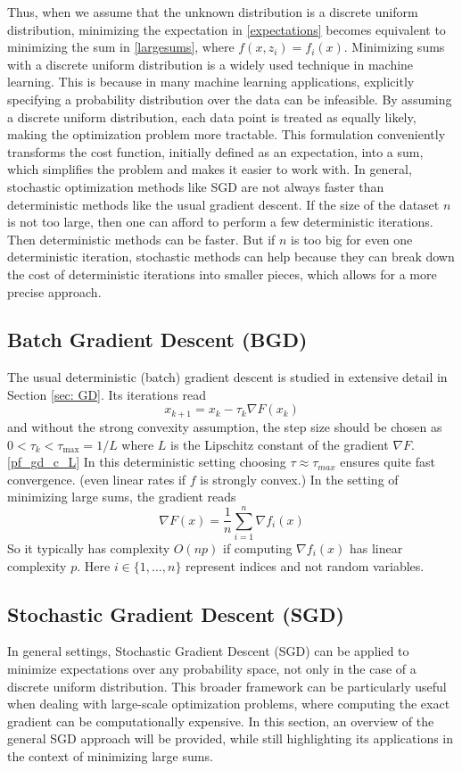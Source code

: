 Thus, when we assume that the unknown distribution is a discrete uniform distribution, minimizing the expectation in \ref{expectations} becomes equivalent to minimizing the sum in \ref{largesums}, where $f(x, z_i) = f_{i}(x).$ Minimizing sums with a discrete uniform distribution is a widely used technique in machine learning. This is because in many machine learning applications, explicitly specifying a probability distribution over the data can be infeasible. By assuming a discrete uniform distribution, each data point is treated as equally likely, making the optimization problem more tractable. This formulation conveniently transforms the cost function, initially defined as an expectation, into a sum, which simplifies the problem and makes it easier to work with. In general, stochastic optimization methods like SGD are not always faster than deterministic methods like the usual gradient descent. If the size of the dataset $n$ is not too large, then one can afford to perform a few deterministic iterations. Then deterministic methods can be faster. But if $n$ is too big for even one deterministic iteration, stochastic methods can help because they can break down the cost of deterministic iterations into smaller pieces, which allows for a more precise approach.

\subsection{Batch Gradient Descent (BGD)}
The usual deterministic (batch) gradient descent is studied in extensive detail in Section \ref{sec: GD}. Its iterations read $$x_{k+1} = x_{k} - \tau_{k}\nabla F(x_{k})$$
and without the strong convexity assumption, the step size should be chosen as $0 < \tau_{k} < \tau_{\text{max}} = 1/L$ where $L$ is the Lipschitz constant of the gradient $\nabla F$. \ref{pf_gd_c_L} In this deterministic setting choosing $\tau \approx \tau_{max}$ ensures quite fast convergence. (even linear rates if $f$ is strongly convex.) In the setting of minimizing large sums, the gradient reads 
\begin{equation*}\label{full_grad_of_sum}\tag{4.3.1}
\nabla F(x) = \frac{1}{n} \sum_{i=1}^{n}\nabla f_{i}(x)
\end{equation*}
So it typically has complexity $O(np)$ if computing $\nabla f_{i}(x)$ has linear complexity $p.$ Here $i \in \{1,\ldots,n\}$ represent indices and not random variables. 

\subsection{Stochastic Gradient Descent (SGD)}
In general settings, Stochastic Gradient Descent (SGD) can be applied to minimize expectations over any probability space, not only in the case of a discrete uniform distribution. This broader framework can be particularly useful when dealing with large-scale optimization problems, where computing the exact gradient can be computationally expensive. In this section, an overview of the general SGD approach will be provided, while still highlighting its applications in the context of minimizing large sums.

